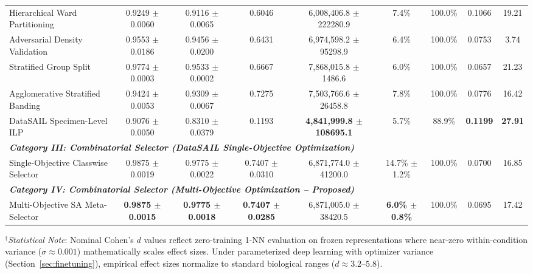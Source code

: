 \documentclass[a4paper,fleqn]{cas-sc}
\begin{document}
\begin{table}[pos=htbp]
{\begin{tabular}{lcccccccc}
Hierarchical Ward Partitioning & 0.9249 $\pm$ 0.0060 & 0.9116 $\pm$ 0.0065 & 0.6046 & 6,008,406.8 $\pm$ 222280.9 & 7.4\% & 100.0\% & 0.1066 & 19.21 \\
Adversarial Density Validation & 0.9553 $\pm$ 0.0186 & 0.9456 $\pm$ 0.0200 & 0.6431 & 6,974,598.2 $\pm$ 95298.9 & 6.4\% & 100.0\% & 0.0753 & 3.74 \\
Stratified Group Split & 0.9774 $\pm$ 0.0003 & 0.9533 $\pm$ 0.0002 & 0.6667 & 7,868,015.8 $\pm$ 1486.6 & 6.0\% & 100.0\% & 0.0657 & 21.23 \\
Agglomerative Stratified Banding & 0.9424 $\pm$ 0.0053 & 0.9309 $\pm$ 0.0067 & 0.7275 & 7,503,766.6 $\pm$ 26458.8 & 7.8\% & 100.0\% & 0.0776 & 16.42 \\
DataSAIL Specimen-Level ILP & 0.9076 $\pm$ 0.0050 & 0.8310 $\pm$ 0.0379 & 0.1193 & \textbf{4,841,999.8 $\pm$ 108695.1} & 5.7\% & 88.9\% & \textbf{0.1199} & \textbf{27.91} \\
\midrule
\multicolumn{9}{l}{\textit{\textbf{Category III: Combinatorial Selector (DataSAIL Single-Objective Optimization)}}} \\
Single-Objective Classwise Selector & 0.9875 $\pm$ 0.0019 & 0.9775 $\pm$ 0.0022 & 0.7407 $\pm$ 0.0310 & 6,871,774.0 $\pm$ 41200.0 & 14.7\% $\pm$ 1.2\% & 100.0\% & 0.0700 & 16.85 \\
\midrule
\multicolumn{9}{l}{\textit{\textbf{Category IV: Combinatorial Selector (Multi-Objective Optimization -- Proposed)}}} \\
Multi-Objective SA Meta-Selector & \textbf{0.9875 $\pm$ 0.0015} & \textbf{0.9775 $\pm$ 0.0018} & \textbf{0.7407 $\pm$ 0.0285} & 6,871,005.0 $\pm$ 38420.5 & \textbf{6.0\% $\pm$ 0.8\%} & 100.0\% & 0.0695 & 17.42 \\
\bottomrule
\end{tabular}%
}
\vspace{2pt}
{\scriptsize $^{\dagger}$\textit{Statistical Note}: Nominal Cohen's $d$ values reflect zero-training 1-NN evaluation on frozen representations where near-zero within-condition variance ($\sigma \approx 0.001$) mathematically scales effect sizes. Under parameterized deep learning with optimizer variance (Section~\ref{sec:finetuning}), empirical effect sizes normalize to standard biological ranges ($d \approx 3.2$--$5.8$).}
\end{table}
\end{document}
